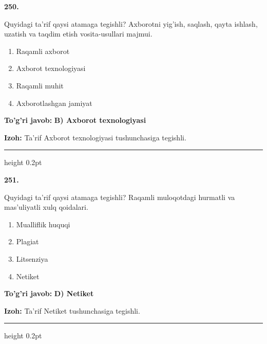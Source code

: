 \documentclass[10pt,a4paper,oneside]{article}
\begin{document}
\noindent\textbf{\color{ink}250.}
\par
Quyidagi ta'rif qaysi atamaga tegishli? Axborotni yig'ish, saqlash, qayta ishlash, uzatish va taqdim etish vosita-usullari majmui.
\begin{enumerate}[label=\Alph*),leftmargin=9mm]
\item Raqamli axborot
\item Axborot texnologiyasi
\item Raqamli muhit
\item Axborotlashgan jamiyat
\end{enumerate}
\begin{tcolorbox}[enhanced,breakable,colback=teal!4,colframe=teal!50!black,boxrule=0.5pt,arc=1.1mm,left=3mm,right=3mm,top=1.7mm,bottom=1.7mm,before skip=2mm,after skip=2mm]
\textbf{\color{teal}To'g'ri javob:} \textbf{B) Axborot texnologiyasi}
\par\smallskip
\textbf{Izoh:} Ta'rif Axborot texnologiyasi tushunchasiga tegishli.
\end{tcolorbox}
\vspace{2mm}\hrule height 0.2pt \vspace{3mm}

\noindent\textbf{\color{ink}251.}
\par
Quyidagi ta'rif qaysi atamaga tegishli? Raqamli muloqotdagi hurmatli va mas'uliyatli xulq qoidalari.
\begin{enumerate}[label=\Alph*),leftmargin=9mm]
\item Mualliflik huquqi
\item Plagiat
\item Litsenziya
\item Netiket
\end{enumerate}
\begin{tcolorbox}[enhanced,breakable,colback=teal!4,colframe=teal!50!black,boxrule=0.5pt,arc=1.1mm,left=3mm,right=3mm,top=1.7mm,bottom=1.7mm,before skip=2mm,after skip=2mm]
\textbf{\color{teal}To'g'ri javob:} \textbf{D) Netiket}
\par\smallskip
\textbf{Izoh:} Ta'rif Netiket tushunchasiga tegishli.
\end{tcolorbox}
\vspace{2mm}\hrule height 0.2pt \vspace{3mm}
\end{document}
